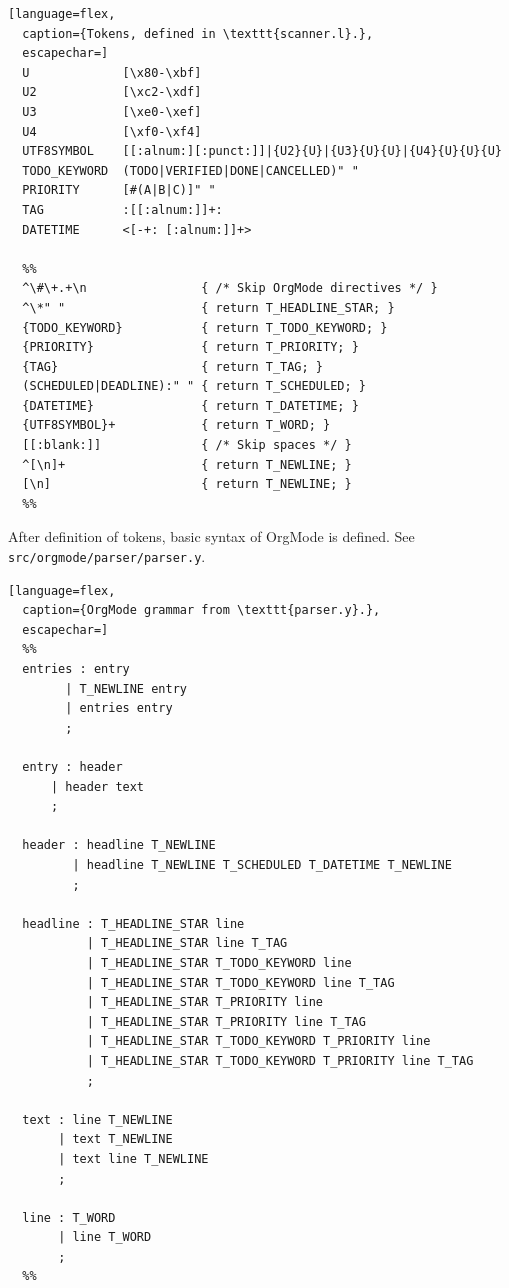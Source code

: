 \documentclass[a4paper,12pt,oneside]{scrartcl}
\begin{document}
\begin{lstlisting}[language=flex,
  caption={Tokens, defined in \texttt{scanner.l}.},
  escapechar=]
  U             [\x80-\xbf]
  U2            [\xc2-\xdf]
  U3            [\xe0-\xef]
  U4            [\xf0-\xf4]
  UTF8SYMBOL    [[:alnum:][:punct:]]|{U2}{U}|{U3}{U}{U}|{U4}{U}{U}{U}
  TODO_KEYWORD  (TODO|VERIFIED|DONE|CANCELLED)" "
  PRIORITY      [#(A|B|C)]" "
  TAG           :[[:alnum:]]+:
  DATETIME      <[-+: [:alnum:]]+>

  %%
  ^\#\+.+\n                { /* Skip OrgMode directives */ }
  ^\*" "                   { return T_HEADLINE_STAR; }
  {TODO_KEYWORD}           { return T_TODO_KEYWORD; }
  {PRIORITY}               { return T_PRIORITY; }
  {TAG}                    { return T_TAG; }
  (SCHEDULED|DEADLINE):" " { return T_SCHEDULED; }
  {DATETIME}               { return T_DATETIME; }
  {UTF8SYMBOL}+            { return T_WORD; }
  [[:blank:]]              { /* Skip spaces */ }
  ^[\n]+                   { return T_NEWLINE; }
  [\n]                     { return T_NEWLINE; }
  %%
\end{lstlisting}


After definition of tokens, basic syntax of OrgMode is defined. See
\texttt{src/orgmode/parser/parser.y}.

\begin{lstlisting}[language=flex,
  caption={OrgMode grammar from \texttt{parser.y}.},
  escapechar=]
  %%
  entries : entry
        | T_NEWLINE entry
        | entries entry
        ;

  entry : header
      | header text
      ;

  header : headline T_NEWLINE
         | headline T_NEWLINE T_SCHEDULED T_DATETIME T_NEWLINE
         ;

  headline : T_HEADLINE_STAR line
           | T_HEADLINE_STAR line T_TAG
           | T_HEADLINE_STAR T_TODO_KEYWORD line
           | T_HEADLINE_STAR T_TODO_KEYWORD line T_TAG
           | T_HEADLINE_STAR T_PRIORITY line
           | T_HEADLINE_STAR T_PRIORITY line T_TAG
           | T_HEADLINE_STAR T_TODO_KEYWORD T_PRIORITY line
           | T_HEADLINE_STAR T_TODO_KEYWORD T_PRIORITY line T_TAG
           ;

  text : line T_NEWLINE
       | text T_NEWLINE
       | text line T_NEWLINE
       ;

  line : T_WORD
       | line T_WORD
       ;
  %%
\end{lstlisting}
\end{document}
